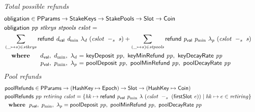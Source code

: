 \begin{figure}[htb]
  \emph{Total possible refunds}
  \begin{align*}
      & \fun{obligation} \in \PParams \to \StakeKeys \to \StakePools \to \Slot \to \Coin \\
      & \obligation{pp}{stkeys}{stpools}{cslot} =\\
      & \sum\limits_{(\_ \mapsto s) \in \var{stkeys}}
        \refund{d_{\mathsf{val}}}{d_{\min}}{\lambda_d}{(\slotminus{cslot}{s})}
        + \sum\limits_{(\_ \mapsto s) \in \var{stpools}}
        \refund{p_{\mathsf{val}}}{p_{\min}}{\lambda_p}{(\slotminus{cslot}{s})} \\
      &
      \begin{array}{lr@{~=~}l}
        \where
          & \dval,~d_{\min},~\lambda_d
          & \fun{keyDeposit}~\var{pp},~\fun{keyMinRefund}~\var{pp},~\fun{keyDecayRate}~\var{pp}
          \\
          & p_{\mathsf{val}},~p_{\min},~\lambda_p
          & \fun{poolDeposit}~\var{pp},~\fun{poolMinRefund}~\var{pp},~\fun{poolDecayRate}~\var{pp}
      \end{array}\\
  \end{align*}
  \emph{Pool refunds}
  \begin{align*}
      & \mathsf{poolRefunds} \in \mathsf{PParams} \to (\mathsf{HashKey} \mapsto \mathsf{Epoch}) \to \mathsf{Slot} \to
        (\mathsf{HashKey} \mapsto \mathsf{Coin}) \\
      & \mathsf{poolRefunds}~ \mathit{pp}~ \mathit{retiring}~ \mathit{cslot} = \left\{
        \mathit{hk}\mapsto
          \mathsf{refund}~ \mathit{p_{\mathsf{val}}}~ \mathit{p_{\min}}~ {\lambda}~ {(\mathit{cslot}~-_{s}~\mathit{(\mathsf{firstSlot}~e)})}
          \mid
          \mathit{hk}\mapsto e\in\mathit{retiring}
        \right\}\\
      & ~ ~ \mathbf{where}~ ~  p_{\mathsf{val}},~p_{\min},~\lambda_p =
          \mathsf{poolDeposit}~\mathit{pp},~\mathsf{poolMinRefund}~\mathit{pp},~\mathsf{poolDecayRate}~\mathit{pp} \\
  \end{align*}


\end{figure}
